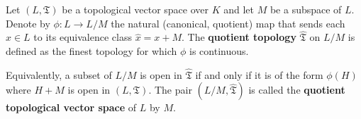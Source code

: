 Let $(L, \mathfrak{T})$ be a topological vector space over $K$ and let $M$ be a subspace of $L$. Denote by $\phi : L \to L/M$ the natural (canonical, quotient) map that sends each $x \in L$ to its equivalence class $\hat{x} = x + M$. The \textbf{quotient topology} $\hat{\mathfrak{T}}$ on $L/M$ is defined as the finest topology for which $\phi$ is continuous.

Equivalently, a subset of $L/M$ is open in $\hat{\mathfrak{T}}$ if and only if it is of the form $\phi(H)$ where $H + M$ is open in $(L, \mathfrak{T})$. The pair $(L/M, \hat{\mathfrak{T}})$ is called the \textbf{quotient topological vector space} of $L$ by $M$.

